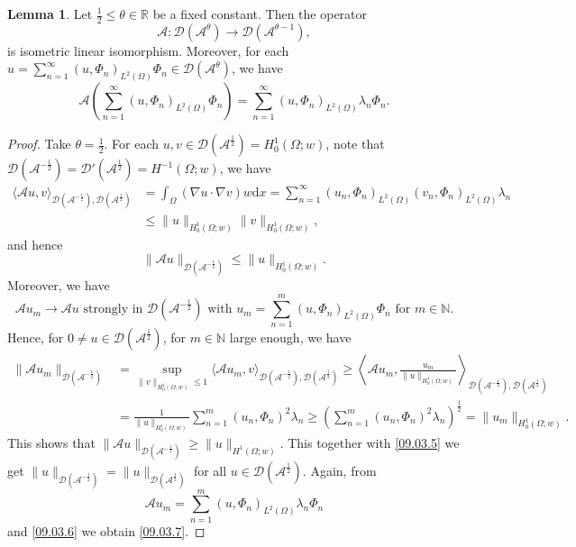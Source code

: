 \documentclass[preprint,12pt]{elsarticle}
\theoremstyle{definition}   %
\newtheorem{lemma}[theorem]{Lemma}
\numberwithin{equation}{section}
\def\ra{\rightarrow}
\def\lg{\langle}
\def\llg{\left\langle}
\def\rg{\rangle}
\def\rrg{\right\rangle}
\def\Om{\Omega}
\def\la{\lambda}
\def\iy{\infty}
\def\f{\frac}
\def\df{\mathrm d}
\def\mcA{\mathcal{A}}
\def\mcD{\mathcal{D}}
\newcommand{\R}{\mathbb R}
\newcommand{\N}{\mathbb N}
\begin{document}
\begin{lemma}\label{09.03.L2}\label{06.28.L1}
	Let $\f{1}{2}\leq \theta\in\R$ be a fixed constant. Then the operator 
	\begin{equation*}
		\mcA: \mcD(\mcA^\theta)\ra \mcD(\mcA^{\theta-1}), 
	\end{equation*}
	is isometric linear isomorphism. Moreover, for each $u=\sum_{n=1}^\iy (u,\Phi_n)_{L^2(\Om)}\Phi_n\in \mcD(\mcA^\theta)$, we have 
	\begin{equation}\label{09.03.7}
		\mcA\left(\sum_{n=1}^\iy (u,\Phi_n)_{L^2(\Om)}\Phi_n\right)=\sum_{n=1}^\iy (u, \Phi_n)_{L^2(\Om)}\la_n\Phi_n. 
	\end{equation}
\end{lemma}

\begin{proof}
	Take $\theta=\f{1}{2}$. For each $u,v\in \mcD(\mcA^\f{1}{2})= H_0^1(\Om;w)$, note that $\mcD(\mcA^{-\f{1}{2}})=\mcD'(\mcA^\f{1}{2})=H^{-1}(\Om;w)$,  we have 
	\begin{equation*}
		\begin{split} 
			\lg \mcA u, v\rg_{\mcD(\mcA^{-\f{1}{2}}),\mcD(\mcA^\f{1}{2})}
			&=\int_\Om (\nabla u\cdot \nabla v)w\df x
			=\sum_{n=1}^\iy (u_n,\Phi_n)_{L^2(\Om)}(v_n,\Phi_n)_{L^2(\Om)}\la_n\\
			&\leq \|u\|_{H_0^1(\Om;w)}\|v\|_{H_0^1(\Om;w)}, 
		\end{split}
	\end{equation*}
	and hence 
	\begin{equation}\label{09.03.5}
		\|\mcA u\|_{\mcD(\mcA^{-\f{1}{2}})}\leq \|u\|_{H_0^1(\Om;w)}. 
	\end{equation}
	Moreover, we have 
	\begin{equation}\label{09.03.6}
		\mcA u_m\ra \mcA u \mbox{ strongly in } \mcD(\mcA^{-\f{1}{2}}) \mbox{ with } u_m=\sum_{n=1}^m (u,\Phi_n)_{L^2(\Om)}\Phi_n \mbox{ for } m\in\N. 
	\end{equation}
	Hence, for $0\neq u\in \mcD(\mcA^\f{1}{2})$, for $m\in\N$ large enough, we have 
	\begin{equation*}
		\begin{split}
			\|\mcA u_m\|_{\mcD(\mcA^{-\f{1}{2}})}
			&=\sup_{\|v\|_{H_0^1(\Om;w)}\leq 1}\lg \mcA u_m, v\rg_{\mcD(\mcA^{-\f{1}{2}}),\mcD(\mcA^\f{1}{2})}\geq \llg \mcA u_m, \f{u_m}{\|u\|_{H_0^1(\Om;w)}}\rrg_{\mcD(\mcA^{-\f{1}{2}}),\mcD(\mcA^\f{1}{2})}\\
			&=\f{1}{\|u\|_{H_0^1(\Om;w)}}\sum_{n=1}^m (u_n,\Phi_n)^2\la_n\geq \left(\sum_{n=1}^m (u_n,\Phi_n)^2\la_n\right)^\f{1}{2}=\|u_m\|_{H_0^1(\Om;w)}.
		\end{split}
	\end{equation*}
	This shows that $\|\mcA u\|_{\mcD(\mcA^{-\f{1}{2}})}\geq \|u\|_{H^1(\Om;w)}$. This together with \eqref{09.03.5} we get $\|u\|_{\mcD(\mcA^{-\f{1}{2}})}=\|u\|_{\mcD(\mcA^\f{1}{2})}$ for all $u\in \mcD(\mcA^\f{1}{2})$. Again, from 
	\begin{equation*}
		\mcA u_m=\sum_{n=1}^m (u,\Phi_n)_{L^2(\Om)}\la_n\Phi_n
	\end{equation*}
	and \eqref{09.03.6} we obtain \eqref{09.03.7}.
	

\end{proof}
\end{document}
